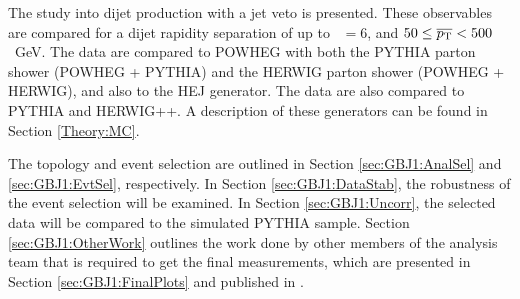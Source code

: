 The study into dijet production with a jet veto is presented.
These observables are compared for a dijet rapidity separation of up to \dy~$=6$, and $50\le\mbox{$\overline{p_{\rm T}}$}{}<500$~GeV.
The data are compared to POWHEG with both the PYTHIA parton shower (POWHEG + PYTHIA) and the HERWIG parton shower (POWHEG + HERWIG), and also to the HEJ generator. 
The data are also compared to PYTHIA and HERWIG++.
A description of these generators can be found in Section \ref{Theory:MC}.

The topology and event selection are outlined in Section \ref{sec:GBJ1:AnalSel} and \ref{sec:GBJ1:EvtSel}, respectively. 
In Section \ref{sec:GBJ1:DataStab}, the robustness of the event selection will be examined. 
In Section \ref{sec:GBJ1:Uncorr}, the selected data will be compared to the simulated PYTHIA sample.
Section \ref{sec:GBJ1:OtherWork} outlines the work done by other members of the analysis team that is required to get the final measurements, which are presented in Section \ref{sec:GBJ1:FinalPlots} and published in \cite{ref:ATLASGap}. 

%
